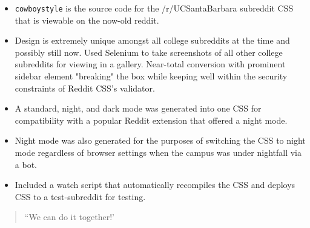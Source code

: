 \documentclass[10pt,letter,ragged2e]{altacv}
\begin{document}
\begin{paracol}{2}

\begin{itemize}
\item \texttt{cowboystyle} is the source code for the /r/UCSantaBarbara subreddit CSS that is viewable on the now-old reddit.
\item Design is extremely unique amongst all college subreddits at the time and possibly still now. Used Selenium to take screenshots of all other college subreddits for viewing in a gallery. Near-total conversion with prominent sidebar element "breaking" the box while keeping well within the security constraints of Reddit CSS's validator.
\item A standard, night, and dark mode was generated into one CSS for compatibility with a popular Reddit extension that offered a night mode.
\item Night mode was also generated for the purposes of switching the CSS to night mode regardless of browser settings when the campus was under nightfall via a bot.
\item Included a watch script that automatically recompiles the CSS and deploys CSS to a test-subreddit for testing.
\end{itemize}

\newpage

\switchcolumn


\begin{quote}
``We can do it together!'
\end{quote}


   

  

  


\medskip




\end{paracol}
\end{document}
